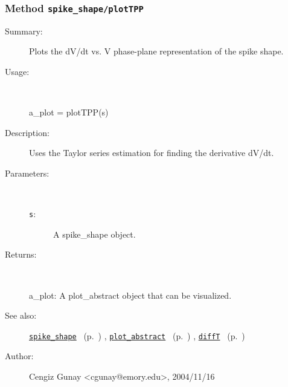 \subsubsection[Method \texttt{plotTPP}]{Method \texttt{spike\_shape/plotTPP}}%
%
\label{ref_spike_shape__plotTPP}%
\hypertarget{ref_spike_shape__plotTPP}{}%
\begin{description}
\item[Summary:]Plots the dV/dt vs. V phase-plane representation of the spike shape.
%
\item[Usage:]~%
\begin{lyxcode}%
a\_plot = plotTPP(s)
%
\end{lyxcode}%
%
\item[Description:]%
Uses the Taylor series estimation for finding the derivative dV/dt.
\item[Parameters:]~
\begin{description}%
\item[\texttt{s}:]
 A spike\_shape object.
\end{description}%
%
\item[Returns:]~

	a\_plot: A plot\_abstract object that can be visualized.
%
%
\item[See also:]%
\hyperlink{ref_spike_shape}{\texttt{spike\_shape}}%
\ (p.~\pageref{ref_spike_shape})%
%
, \hyperlink{ref_plot_abstract}{\texttt{plot\_abstract}}%
\ (p.~\pageref{ref_plot_abstract})%
%
, \hyperlink{ref_diffT}{\texttt{diffT}}%
\ (p.~\pageref{ref_diffT})%
%
%
\item[Author:]%
Cengiz Gunay <cgunay@emory.edu>, 2004/11/16%
\end{description}
\methodline%
